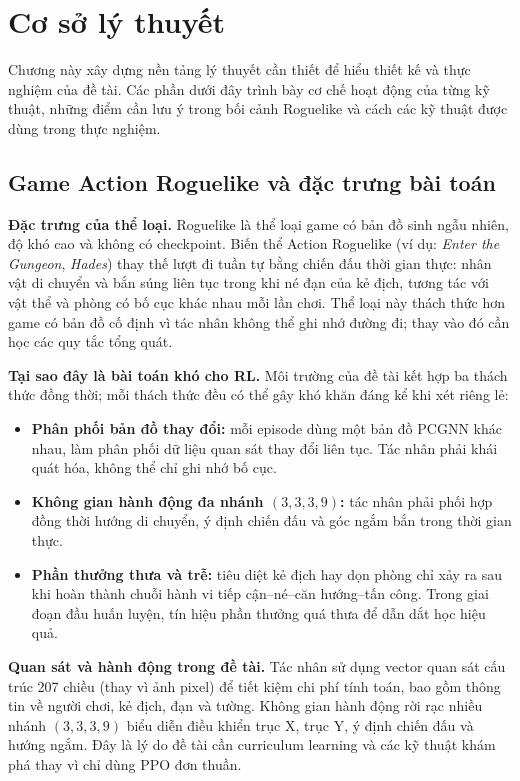 \clearpage
{}

\setcounter{chapter}{0}
\chapter[{Cơ sở lý thuyết}]{Cơ sở lý thuyết}

Chương này xây dựng nền tảng lý thuyết cần thiết để hiểu thiết kế và thực nghiệm của đề tài. Các phần dưới đây trình bày cơ chế hoạt động của từng kỹ thuật, những điểm cần lưu ý trong bối cảnh Roguelike và cách các kỹ thuật được dùng trong thực nghiệm.

\section{Game Action Roguelike và đặc trưng bài toán}

\textbf{Đặc trưng của thể loại.} Roguelike là thể loại game có bản đồ sinh ngẫu nhiên, độ khó cao và không có checkpoint. Biến thể Action Roguelike (ví dụ: \textit{Enter the Gungeon}, \textit{Hades}) thay thế lượt đi tuần tự bằng chiến đấu thời gian thực: nhân vật di chuyển và bắn súng liên tục trong khi né đạn của kẻ địch, tương tác với vật thể và phòng có bố cục khác nhau mỗi lần chơi. Thể loại này thách thức hơn game có bản đồ cố định vì tác nhân không thể ghi nhớ đường đi; thay vào đó cần học các quy tắc tổng quát.

\textbf{Tại sao đây là bài toán khó cho RL.} Môi trường của đề tài kết hợp ba thách thức đồng thời; mỗi thách thức đều có thể gây khó khăn đáng kể khi xét riêng lẻ:

\begin{itemize}
    \item \textbf{Phân phối bản đồ thay đổi:} mỗi episode dùng một bản đồ PCGNN khác nhau, làm phân phối dữ liệu quan sát thay đổi liên tục. Tác nhân phải khái quát hóa, không thể chỉ ghi nhớ bố cục.
    \item \textbf{Không gian hành động đa nhánh $(3,3,3,9)$:} tác nhân phải phối hợp đồng thời hướng di chuyển, ý định chiến đấu và góc ngắm bắn trong thời gian thực.
    \item \textbf{Phần thưởng thưa và trễ:} tiêu diệt kẻ địch hay dọn phòng chỉ xảy ra sau khi hoàn thành chuỗi hành vi tiếp cận--né--căn hướng--tấn công. Trong giai đoạn đầu huấn luyện, tín hiệu phần thưởng quá thưa để dẫn dắt học hiệu quả.
\end{itemize}

\textbf{Quan sát và hành động trong đề tài.} Tác nhân sử dụng vector quan sát cấu trúc 207 chiều (thay vì ảnh pixel) để tiết kiệm chi phí tính toán, bao gồm thông tin về người chơi, kẻ địch, đạn và tường. Không gian hành động rời rạc nhiều nhánh $(3,3,3,9)$ biểu diễn điều khiển trục X, trục Y, ý định chiến đấu và hướng ngắm. Đây là lý do đề tài cần curriculum learning và các kỹ thuật khám phá thay vì chỉ dùng PPO đơn thuần.

